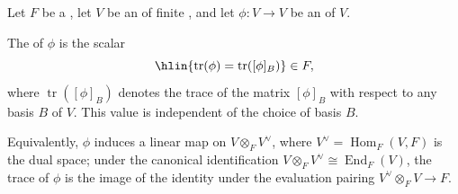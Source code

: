 \begin{definition} \label{definition:trace_of_an_endomorphism_of_a_vector_space_over_a_field}
Let $F$ be a , let $V$ be an  of finite , and let $\phi : V \to V$ be an  of $V$.

The  of $\phi$ is the scalar
$$\hlin{\operatorname{tr}(\phi) = \operatorname{tr}([\phi]_B)} \in F,$$
where $\operatorname{tr}([\phi]_B)$ denotes the trace of the matrix $[\phi]_B$ with respect to any basis $B$ of $V$. This value is independent of the choice of basis $B$.

Equivalently, $\phi$ induces a linear map on $V \otimes_F V^\vee$, where $V^\vee = \operatorname{Hom}_F(V, F)$ is the dual space; under the canonical identification $V \otimes_F V^\vee \cong \operatorname{End}_F(V)$, the trace of $\phi$ is the image of the identity under the evaluation pairing $V^\vee \otimes_F V \to F$.
\end{definition}
